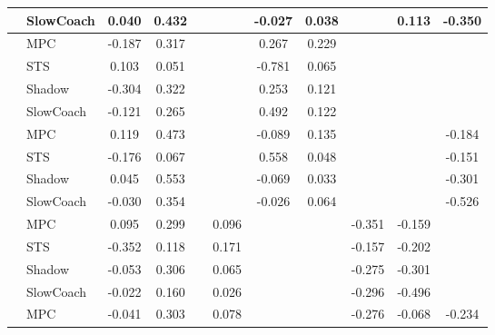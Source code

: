 \begin{tabular}{|l|l|*{9}{c|}}
                                                           & SlowCoach &    0.040 &     0.432 &        &     & -0.027 &  0.038 &      &   0.113 &   -0.350 \\
\midrule
[True, True, False, False, True, True, False, False, False] & MPC &   -0.187 &     0.317 &        &     &  0.267 &  0.229 &      &      &       \\
                                                           & STS &    0.103 &     0.051 &        &     & -0.781 &  0.065 &      &      &       \\
                                                           & Shadow &   -0.304 &     0.322 &        &     &  0.253 &  0.121 &      &      &       \\
                                                           & SlowCoach &   -0.121 &     0.265 &        &     &  0.492 &  0.122 &      &      &       \\
\midrule
[True, True, False, False, True, True, False, False, True] & MPC &    0.119 &     0.473 &        &     & -0.089 &  0.135 &      &      &   -0.184 \\
                                                           & STS &   -0.176 &     0.067 &        &     &  0.558 &  0.048 &      &      &   -0.151 \\
                                                           & Shadow &    0.045 &     0.553 &        &     & -0.069 &  0.033 &      &      &   -0.301 \\
                                                           & SlowCoach &   -0.030 &     0.354 &        &     & -0.026 &  0.064 &      &      &   -0.526 \\
\midrule
[True, True, False, True, False, False, True, True, False] & MPC &    0.095 &     0.299 &        &  0.096 &     &     &  -0.351 &  -0.159 &       \\
                                                           & STS &   -0.352 &     0.118 &        &  0.171 &     &     &  -0.157 &  -0.202 &       \\
                                                           & Shadow &   -0.053 &     0.306 &        &  0.065 &     &     &  -0.275 &  -0.301 &       \\
                                                           & SlowCoach &   -0.022 &     0.160 &        &  0.026 &     &     &  -0.296 &  -0.496 &       \\
\midrule
[True, True, False, True, False, False, True, True, True] & MPC &   -0.041 &     0.303 &        &  0.078 &     &     &  -0.276 &  -0.068 &   -0.234 \\

\end{tabular}
